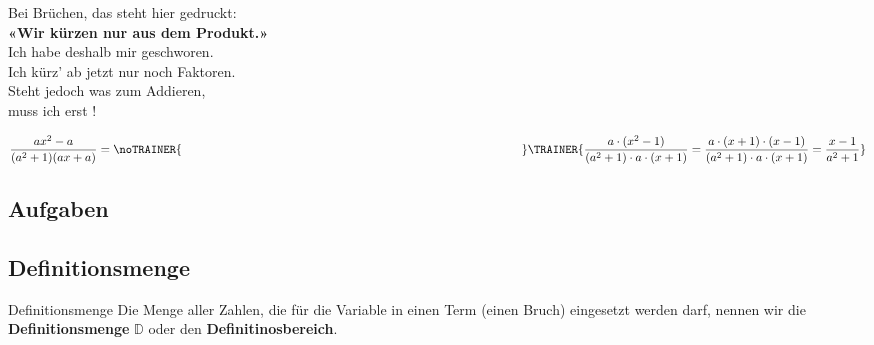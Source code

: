\begin{rezept}{}{}

\begin{center}Bei Brüchen, das steht hier gedruckt:\\
\textbf{«Wir kürzen nur aus dem Produkt.»}\\

Ich habe deshalb mir geschworen.\\
Ich kürz' ab jetzt nur noch Faktoren.\\

Steht jedoch was zum Addieren,\noTRAINER{\vspace{5mm}}\\
muss ich erst \noTRAINER{\hspace{5cm}}!\\
\end{center}
\end{rezept}
\newpage

\begin{beispiel}{}{}
$$\frac{ax^2 - a}{(a^2+1)(ax+a)} = \noTRAINER{\hspace{10cm}}\TRAINER{\frac{a\cdot{}(x^2-1)}{(a^2+1)\cdot{}a\cdot{}(x+1)}=\frac{a\cdot{}(x+1)\cdot{}(x-1)}{(a^2+1)\cdot{}a\cdot{}(x+1)}=\frac{x-1}{a^2+1}} $$
\end{beispiel}

\subsection*{Aufgaben}
%

%

\newpage

\subsection{Definitionsmenge}

\begin{definition}{Definitionsmenge}{}
Die Menge aller Zahlen, die für die Variable in einen Term (\zB einen
Bruch) eingesetzt werden darf, nennen wir
die \textbf{Definitionsmenge} $\mathbb{D}$ oder den \textbf{Definitinosbereich}.
\end{definition}

